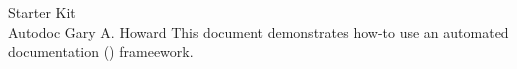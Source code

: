 \documentclass[10pt]{tlc-article}
\begin{document}
  \tlcTitlePageAndTableOfContents
    {Starter Kit \\ Autodoc}
    {Gary A. Howard}
    {This document demonstrates how-to use an automated documentation
     (\skAutoDoc) frameework.}

  

  \makeatletter
  \tlcDebug
  \autodocDebug
\end{document}
